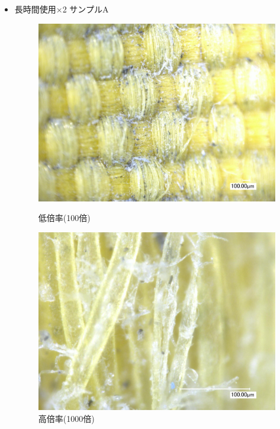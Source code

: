 \documentclass[main]{subfiles}
\begin{document}
\begin{itemize}
    \item 長時間使用×2
    サンプルA
    \begin{figure}[H]
        \centering
        \begin{minipage}[htbp]{0.45\linewidth}
            \centering
            \includegraphics[keepaspectratio, width=0.8\linewidth]{figures/縁/カーリングパッド長期低倍率.jpg}
            \caption{低倍率(100倍)}
            \label{fig:label}
        \end{minipage}
        \begin{minipage}[htbp]{0.45\linewidth}
            \centering
            \includegraphics[keepaspectratio, width=0.8\linewidth]{figures/縁/カーリングパッド長期.jpg}
            \caption{高倍率(1000倍)}
            \label{fig:label}
        \end{minipage}
    \end{figure}
    

\end{itemize}
\end{document}
